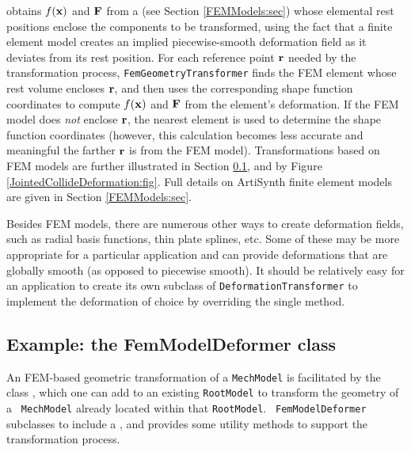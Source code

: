 obtains
$f({\bf x})$ and ${\bf F}$ from a
 (see Section
\ref{FEMModels:sec}) whose elemental rest positions enclose the
components to be transformed, using the fact that a finite element
model creates an implied piecewise-smooth deformation field as it
deviates from its rest position. For each reference point ${\bf r}$ needed
by the transformation process, {\tt FemGeometryTransformer} finds the
FEM element whose rest volume encloses ${\bf r}$, and then uses the
corresponding shape function coordinates to compute $f({\bf x})$ and ${\bf F}$
from the element's deformation. If the FEM model does {\it not}
enclose ${\bf r}$, the nearest element is used to determine the shape
function coordinates (however, this calculation becomes less accurate and
meaningful the farther ${\bf r}$ is from the FEM model). Transformations based
on FEM models are further illustrated in Section
\ref{FemModelDeformer:sec}, and by Figure
\ref{JointedCollideDeformation:fig}. Full details on ArtiSynth finite
element models are given in Section \ref{FEMModels:sec}.

Besides FEM models, there are numerous other ways to create
deformation fields, such as radial basis functions, thin plate
splines, etc. Some of these may be more appropriate for a particular
application and can provide deformations that are globally smooth (as
opposed to piecewise smooth).  It should be relatively easy for an
application to create its own subclass of {\tt DeformationTransformer}
to implement the deformation of choice by overriding the single
method.

\subsection{Example: the FemModelDeformer class}
\label{FemModelDeformer:sec}

An FEM-based geometric transformation of a {\tt MechModel} is
facilitated by the class
, which one can
add to an existing {\tt RootModel} to transform the geometry of a {\tt
MechModel} already located within that {\tt RootModel}.  {\tt
FemModelDeformer} subclasses
 to include a
, and
provides some utility methods to support the transformation process.

